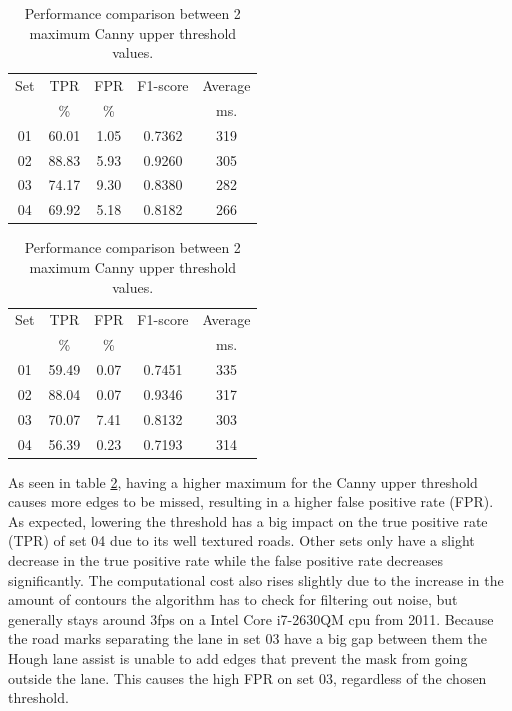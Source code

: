 \documentclass[oneside,english]{llncs}
\begin{document}
\begin{table}
    \begin{subtable}{.5\linewidth}
      \centering
        \begin{tabular}{ |c |c c c | c | } 
        \hline
         Set & TPR & FPR & F1-score & Average \\ 
          & \% & \% & & ms.\\ 
         \hline
     01 & 60.01 & 1.05 & 0.7362 & 319 \\ 
     02 & 88.83 & 5.93 & 0.9260 & 305 \\ 
     03 & 74.17 & 9.30 & 0.8380 & 282 \\ 
     04 & 69.92 & 5.18 & 0.8182 & 266 \\ 
     \hline
    \end{tabular}
    \caption{Threshold of 100.}
    
    \end{subtable}%
    \begin{subtable}{.5\linewidth}
      \centering
           \begin{tabular}{ |c |c c c | c | } 
         \hline
         Set & TPR & FPR & F1-score & Average \\ 
          & \% & \% & & ms.\\ 
         \hline
         01 & 59.49 & 0.07 & 0.7451 & 335 \\ 
         02 & 88.04 & 0.07 & 0.9346 & 317 \\ 
         03 & 70.07 & 7.41 & 0.8132 & 303 \\ 
         04 & 56.39 & 0.23 & 0.7193 & 314 \\ 
         \hline
        \end{tabular}
        \caption{Threshold of 50.}
    \end{subtable} 
    \caption{Performance comparison between 2 maximum Canny upper threshold values.}
    \label{tableresults}
    \vspace{-4em} %
\end{table}

As seen in table \ref{tableresults}, having a higher maximum for the Canny upper threshold causes more edges to be missed, resulting in a higher false positive rate (FPR). As expected, lowering the threshold has a big impact on the true positive rate (TPR) of set 04 due to its well textured roads. Other sets only have a slight decrease in the true positive rate while the false positive rate decreases significantly. The computational cost also rises slightly due to the increase in the amount of contours the algorithm has to check for filtering out noise, but generally stays around 3fps on a Intel Core i7-2630QM cpu from 2011. Because the road marks separating the lane in set 03 have a big gap between them the Hough lane assist is unable to add edges that prevent the mask from going outside the lane. This causes the high FPR on set 03, regardless of the chosen threshold.
\end{document}
